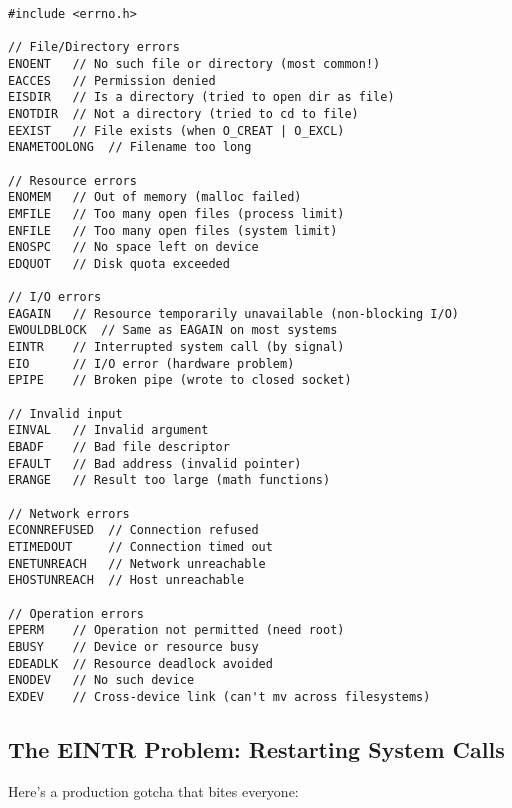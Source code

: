 \begin{lstlisting}
#include <errno.h>

// File/Directory errors
ENOENT   // No such file or directory (most common!)
EACCES   // Permission denied
EISDIR   // Is a directory (tried to open dir as file)
ENOTDIR  // Not a directory (tried to cd to file)
EEXIST   // File exists (when O_CREAT | O_EXCL)
ENAMETOOLONG  // Filename too long

// Resource errors
ENOMEM   // Out of memory (malloc failed)
EMFILE   // Too many open files (process limit)
ENFILE   // Too many open files (system limit)
ENOSPC   // No space left on device
EDQUOT   // Disk quota exceeded

// I/O errors
EAGAIN   // Resource temporarily unavailable (non-blocking I/O)
EWOULDBLOCK  // Same as EAGAIN on most systems
EINTR    // Interrupted system call (by signal)
EIO      // I/O error (hardware problem)
EPIPE    // Broken pipe (wrote to closed socket)

// Invalid input
EINVAL   // Invalid argument
EBADF    // Bad file descriptor
EFAULT   // Bad address (invalid pointer)
ERANGE   // Result too large (math functions)

// Network errors
ECONNREFUSED  // Connection refused
ETIMEDOUT     // Connection timed out
ENETUNREACH   // Network unreachable
EHOSTUNREACH  // Host unreachable

// Operation errors
EPERM    // Operation not permitted (need root)
EBUSY    // Device or resource busy
EDEADLK  // Resource deadlock avoided
ENODEV   // No such device
EXDEV    // Cross-device link (can't mv across filesystems)
\end{lstlisting}

\subsection{The EINTR Problem: Restarting System Calls}

Here's a production gotcha that bites everyone:

